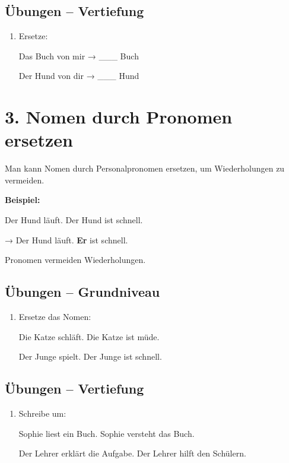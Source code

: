\documentclass[a4paper,12pt]{article}
\begin{document}
\subsection*{Übungen – Vertiefung}

\begin{enumerate}
\item Ersetze:

Das Buch von mir → \_\_\_ Buch  

Der Hund von dir → \_\_\_ Hund  
\end{enumerate}

\section*{3. Nomen durch Pronomen ersetzen}

Man kann Nomen durch Personalpronomen ersetzen, um Wiederholungen zu vermeiden.

\textbf{Beispiel:}

Der Hund läuft. Der Hund ist schnell.  

→ Der Hund läuft. \textbf{Er} ist schnell.

\begin{merksatz}
Pronomen vermeiden Wiederholungen.
\end{merksatz}

\subsection*{Übungen – Grundniveau}

\begin{enumerate}
\item Ersetze das Nomen:

Die Katze schläft. Die Katze ist müde.

Der Junge spielt. Der Junge ist schnell.
\end{enumerate}

\subsection*{Übungen – Vertiefung}

\begin{enumerate}
\item Schreibe um:

Sophie liest ein Buch. Sophie versteht das Buch.

Der Lehrer erklärt die Aufgabe. Der Lehrer hilft den Schülern.
\end{enumerate}
\end{document}
